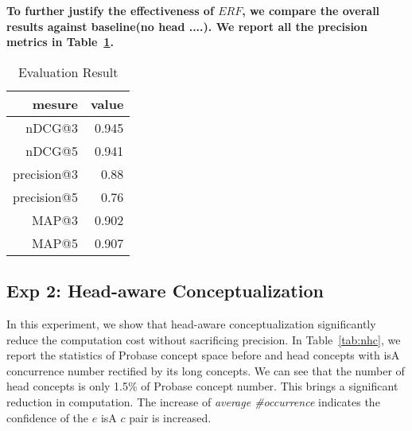 

{\bf 
To further justify the effectiveness of $ERF$, we compare the overall results against baseline(no head ....).
  We report all the precision metrics in Table~\ref{tab:ndcg}. 
}

\begin{table}[htbp]
  \centering
  \caption{Evaluation Result}
    \begin{tabular}{rr}
    \toprule
    mesure & value \\
    \midrule
    nDCG@3 & 0.945 \\
    nDCG@5 & 0.941 \\
    precision@3 & 0.88 \\
    precision@5 & 0.76 \\
    MAP@3 & 0.902 \\
    MAP@5 & 0.907 \\

    \bottomrule
    \end{tabular}%
  \label{tab:ndcg}%
\end{table}%





\subsection{Exp 2: Head-aware Conceptualization}
In this experiment, we show that head-aware conceptualization significantly reduce the computation cost without sacrificing precision. In Table~\ref{tab:nhc}, we report the statistics of Probase concept space before and head concepts with isA concurrence number rectified by its long concepts. We can see that the number of head concepts is only 1.5\% of Probase concept number. This brings a significant reduction in computation. 
The increase of \emph{average \#occurrence} indicates the confidence of the $e$ isA $c$ pair is increased.

